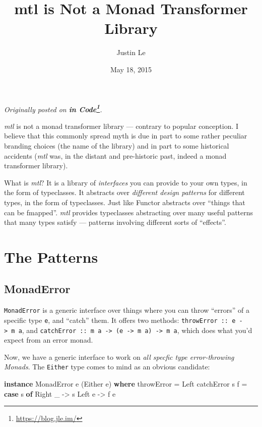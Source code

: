 \documentclass[]{article}
\title{mtl is Not a Monad Transformer Library}
\author{Justin Le}
\date{May 18, 2015}
\newenvironment{Shaded}{}{}
\newcommand{\KeywordTok}[1]{\textcolor[rgb]{0.00,0.44,0.13}{\textbf{{#1}}}}
\newcommand{\DataTypeTok}[1]{\textcolor[rgb]{0.56,0.13,0.00}{{#1}}}
\newcommand{\OtherTok}[1]{\textcolor[rgb]{0.00,0.44,0.13}{{#1}}}
\newcommand{\FunctionTok}[1]{\textcolor[rgb]{0.02,0.16,0.49}{{#1}}}
\newcommand{\NormalTok}[1]{{#1}}
\renewcommand{\href}[2]{#2\footnote{\url{#1}}}
\begin{document}
\maketitle

\emph{Originally posted on \textbf{\href{https://blog.jle.im/}{in
Code}}.}

\emph{mtl} is not a monad transformer library --- contrary to popular
conception. I believe that this commonly spread myth is due in part to
some rather peculiar branding choices (the name of the library) and in
part to some historical accidents (\emph{mtl} was, in the distant and
pre-historic past, indeed a monad transformer library).

What is \emph{mtl}? It is a library of \emph{interfaces} you can provide
to your own types, in the form of typeclasses. It abstracts over
\emph{different design patterns} for different types, in the form of
typeclasses. Just like Functor abstracts over ``things that can be
fmapped''. \emph{mtl} provides typeclasses abstracting over many useful
patterns that many types satisfy --- patterns involving different sorts
of ``effects''.

\section{The Patterns}\label{the-patterns}

\subsection{MonadError}\label{monaderror}

\texttt{MonadError} is a generic interface over things where you can
throw ``errors'' of a specific type \texttt{e}, and ``catch'' them. It
offers two methods: \texttt{throwError\ ::\ e\ -\textgreater{}\ m\ a},
and
\texttt{catchError\ ::\ m\ a\ -\textgreater{}\ (e\ -\textgreater{}\ m\ a)\ -\textgreater{}\ m\ a},
which does what you'd expect from an error monad.

Now, we have a generic interface to work on \emph{all specfic type
error-throwing Monads}. The \texttt{Either} type comes to mind as an
obvious candidate:

\begin{Shaded}
\begin{Highlighting}[]
\KeywordTok{instance} \DataTypeTok{MonadError} \NormalTok{e (}\DataTypeTok{Either} \NormalTok{e) }\KeywordTok{where}
    \NormalTok{throwError }\FunctionTok{=} \DataTypeTok{Left}
    \NormalTok{catchError s f }\FunctionTok{=} \KeywordTok{case} \NormalTok{s }\KeywordTok{of}
                       \DataTypeTok{Right} \NormalTok{_ }\OtherTok{->} \NormalTok{s}
                       \DataTypeTok{Left} \NormalTok{e  }\OtherTok{->} \NormalTok{f e}
\end{Highlighting}
\end{Shaded}
\end{document}
